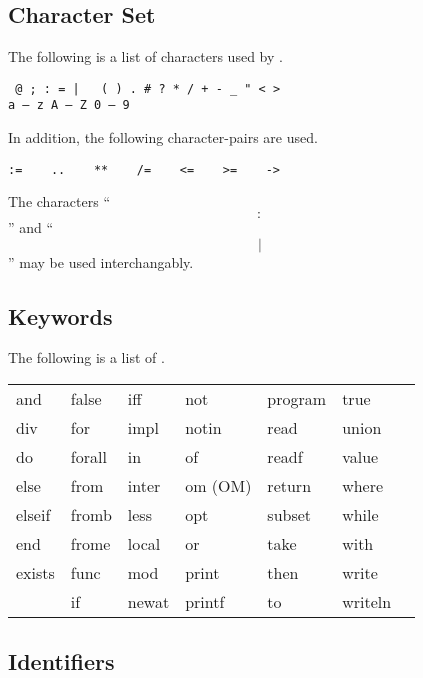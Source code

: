 \subsection{Character Set}  

The following is a list of characters used by \ISETL{}\@.

\CS\tt
\verb|@ |\verb@[ ] ; : = | { } ( ) . # ? * / + - _ " < > % ~ ,@\\
\mbox{}\\
a {\rm ---} z         A {\rm ---} Z        0 {\rm ---} 9\\
\CE

\noindent
In addition, the following character-pairs are used.

\CS
\verb|:=    ..    **    /=    <=    >=    ->|
\CE

The characters ``\[:\]'' and ``\[|\]'' may be used interchangably.

\subsection{Keywords}

The following is a list of \ISETL{} .
		
		      
			
			
			
			
			
			
			
			
			
			
\DS
\begin{tabular}{ l l l l l l l}
and&	false&	iff&	not&	program&true\\
div&	for&	impl&	notin&	read&	union\\
do&	forall&	in&	of&	readf&	value\\
else&	from&	inter&	om (OM)&return&	where\\
elseif&	fromb&	less&	opt&	subset&	while\\
end&	frome&	local&	or&	take&	with\\
exists&	func&	mod&	print&	then&	write\\
&	if&	newat&	printf&	to&	writeln
\end{tabular}
\DE

\subsection{Identifiers}

